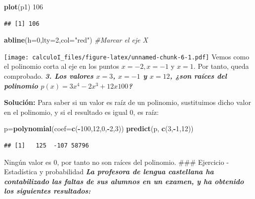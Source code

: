 \documentclass[12pt,]{report}
\newenvironment{Shaded}{\begin{snugshade}}{\end{snugshade}}
\newcommand{\CommentTok}[1]{\textcolor[rgb]{0.56,0.35,0.01}{\textit{#1}}}
\newcommand{\DataTypeTok}[1]{\textcolor[rgb]{0.13,0.29,0.53}{#1}}
\newcommand{\DecValTok}[1]{\textcolor[rgb]{0.00,0.00,0.81}{#1}}
\newcommand{\KeywordTok}[1]{\textcolor[rgb]{0.13,0.29,0.53}{\textbf{#1}}}
\newcommand{\NormalTok}[1]{#1}
\newcommand{\OperatorTok}[1]{\textcolor[rgb]{0.81,0.36,0.00}{\textbf{#1}}}
\newcommand{\StringTok}[1]{\textcolor[rgb]{0.31,0.60,0.02}{#1}}
\theoremstyle{slplain}
\begin{document}
\begin{Shaded}
\begin{Highlighting}[]
\KeywordTok{plot}\NormalTok{(p1)}
\DecValTok{106}
\end{Highlighting}
\end{Shaded}

\begin{verbatim}
## [1] 106
\end{verbatim}

\begin{Shaded}
\begin{Highlighting}[]
\KeywordTok{abline}\NormalTok{(}\DataTypeTok{h=}\DecValTok{0}\NormalTok{,}\DataTypeTok{lty=}\DecValTok{2}\NormalTok{,}\DataTypeTok{col=}\StringTok{"red"}\NormalTok{) }\CommentTok{#Marcar el eje X}
\end{Highlighting}
\end{Shaded}

\texttt{[image: calculoI\_files/figure-latex/unnamed-chunk-6-1.pdf]}
Vemos como el polinomio corta al eje en los puntos \(x=-2, x=-1\) y \(x=1\). Por tanto, queda
comprobado.
\textbf{\emph{3. Los valores \(x=3\), \(x=-1\) y \(x=12\), ¿son raíces del polinomio \(p(x)=3x^4-2x^3+12x100\)? }}

\textbf{Solución:}
Para saber si un valor es raíz de un polinomio, sustituimos dicho valor en el polinomio, y si el
resultado es igual 0, es raíz:

\begin{Shaded}
\begin{Highlighting}[]
\NormalTok{p=}\KeywordTok{polynomial}\NormalTok{(}\DataTypeTok{coef=}\KeywordTok{c}\NormalTok{(}\OperatorTok{-}\DecValTok{100}\NormalTok{,}\DecValTok{12}\NormalTok{,}\DecValTok{0}\NormalTok{,}\OperatorTok{-}\DecValTok{2}\NormalTok{,}\DecValTok{3}\NormalTok{))}
\KeywordTok{predict}\NormalTok{(p, }\KeywordTok{c}\NormalTok{(}\DecValTok{3}\NormalTok{,}\OperatorTok{-}\DecValTok{1}\NormalTok{,}\DecValTok{12}\NormalTok{))}
\end{Highlighting}
\end{Shaded}

\begin{verbatim}
## [1]   125  -107 58796
\end{verbatim}

Ningún valor es 0, por tanto no son raíces del polinomio.
\#\#\# Ejercicio - Estadística y probabilidad
\textbf{\emph{La profesora de lengua castellana ha contabilizado las faltas de sus alumnos en un examen,
y ha obtenido los siguientes resultados:}}
\end{document}
